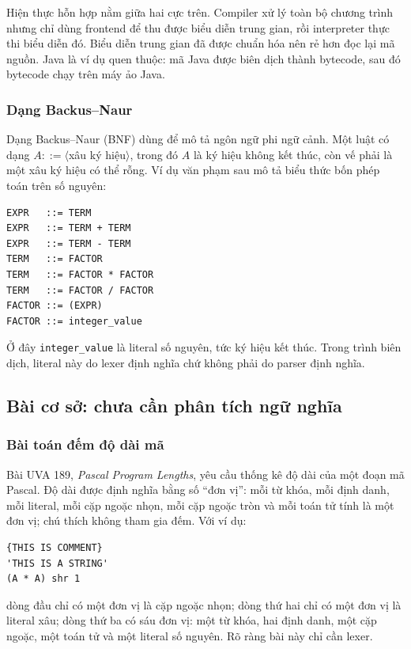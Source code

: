 \documentclass[11pt]{article}
\begin{document}
Hiện thực hỗn hợp nằm giữa hai cực trên. Compiler xử lý toàn bộ chương trình
nhưng chỉ dùng frontend để thu được biểu diễn trung gian, rồi interpreter thực
thi biểu diễn đó. Biểu diễn trung gian đã được chuẩn hóa nên rẻ hơn đọc lại mã
nguồn. Java là ví dụ quen thuộc: mã Java được biên dịch thành bytecode, sau đó
bytecode chạy trên máy ảo Java.

\subsubsection{Dạng Backus--Naur}

Dạng Backus--Naur (BNF) dùng để mô tả ngôn ngữ phi ngữ cảnh. Một luật có dạng
\(A ::= \langle\)xâu ký hiệu\(\rangle\), trong đó \(A\) là ký hiệu không kết
thúc, còn vế phải là một xâu ký hiệu có thể rỗng. Ví dụ văn phạm sau mô tả biểu
thức bốn phép toán trên số nguyên:

\begin{verbatim}
EXPR   ::= TERM
EXPR   ::= TERM + TERM
EXPR   ::= TERM - TERM
TERM   ::= FACTOR
TERM   ::= FACTOR * FACTOR
TERM   ::= FACTOR / FACTOR
FACTOR ::= (EXPR)
FACTOR ::= integer_value
\end{verbatim}

Ở đây \texttt{integer\_value} là literal số nguyên, tức ký hiệu kết thúc. Trong
trình biên dịch, literal này do lexer định nghĩa chứ không phải do parser định
nghĩa.

\subsection{Bài cơ sở: chưa cần phân tích ngữ nghĩa}

\subsubsection{Bài toán đếm độ dài mã}

Bài UVA 189, \emph{Pascal Program Lengths}, yêu cầu thống kê độ dài của một
đoạn mã Pascal. Độ dài được định nghĩa bằng số ``đơn vị'': mỗi từ khóa, mỗi định
danh, mỗi literal, mỗi cặp ngoặc nhọn, mỗi cặp ngoặc tròn và mỗi toán tử tính
là một đơn vị; chú thích không tham gia đếm. Với ví dụ:

\begin{verbatim}
{THIS IS COMMENT}
'THIS IS A STRING'
(A * A) shr 1
\end{verbatim}

dòng đầu chỉ có một đơn vị là cặp ngoặc nhọn; dòng thứ hai chỉ có một đơn vị là
literal xâu; dòng thứ ba có sáu đơn vị: một từ khóa, hai định danh, một cặp
ngoặc, một toán tử và một literal số nguyên. Rõ ràng bài này chỉ cần lexer.
\end{document}
